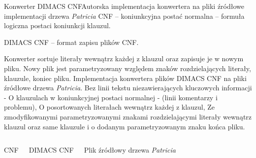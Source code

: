 \documentclass[aspectratio=1610,english]{beamer} %
\begin{document}
	\begin{frame}{Konwerter DIMACS CNF}{Autorska implementacja konwertera na pliki źródłowe implementacji drzewa \emph{Patricia}}
	\scriptsize
	{\color{AGH@green}CNF} – koniunkcyjna postać normalna – formuła logiczna postaci koniunkcji klauzul. 
	
    {\color{AGH@green}DIMACS CNF} – format zapisu plików CNF.
    
    {\color{AGH@green}Konwerter} sortuje literały wewnątrz każdej z klauzul oraz zapisuje je w nowym pliku. \newline 
        \hspace*{0.76cm}Nowy plik jest parametryzowany względem znaków rozdzielających literały, klauzule, koniec pliku. \newline
	    {   \color{gray}\tiny
	        \hspace*{0.76cm} Implementacja konwertera plików DIMACS CNF na pliki źródłowe drzewa \emph{Patricia}. \newline
	        {   \color{gray}\tiny
	            \hspace*{1.25cm} Bez linii tekstu niezawierających kluczowych informacji \newline 
	                \hspace*{1.75cm} {\color{lightgray} - O klauzulach w koniunkcyjnej postaci normalnej - (linii komentarzy i problemu),} \newline 
	            \hspace*{1.25cm} O posortowanych literałach wewnątrz każdej z klauzul, \newline 
	            \hspace*{1.25cm} Ze zmodyfikowanymi parametryzowanymi znakami rozdzielającymi literały wewnątrz klauzul oraz same klauzule \newline
	            \hspace*{1.25cm} i o dodanym parametryzowanym znaku końca pliku.
	        }
	    }
	    \vspace*{-0.1cm}
	    \begin{columns}
	            \usebox\cnfBox \newline
	            
	            {\color{gray}\scriptsize CNF}
	            \usebox\cnfIn \newline
	            
	            {\color{gray}\scriptsize DIMACS CNF}
	            \usebox\cnfOut \newline
	            
	            {\color{gray}\scriptsize Plik źródłowy drzewa \emph{Patricia}}
	    \end{columns}
	\end{frame}	
\end{document}
